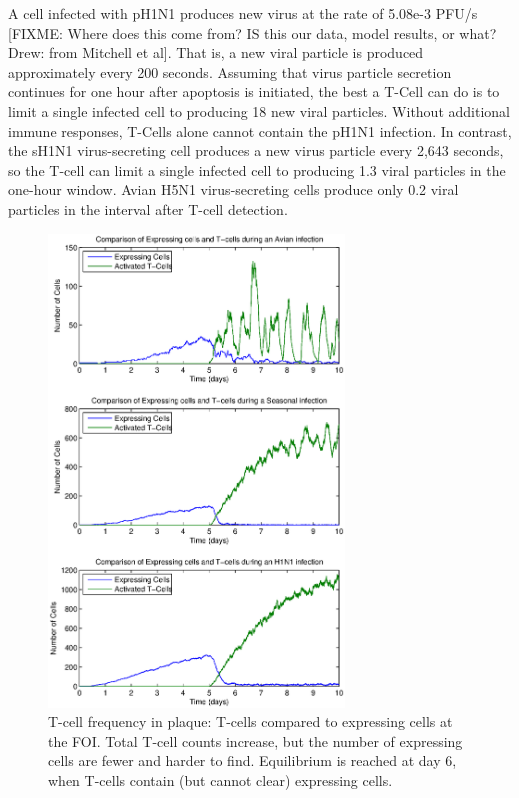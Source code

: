 \documentclass[10pt]{article}
\begin{document}
A cell infected with pH1N1 produces new virus at the rate of 5.08e-3 PFU/s [FIXME: Where does this come from? IS this our data, model results, or what? Drew: from Mitchell et al].  That is, a new viral particle is produced approximately every 200 seconds.  Assuming that virus particle secretion continues for one hour after apoptosis is initiated, the best a T-Cell can do is to limit a single infected cell to producing 18 new viral particles.  Without additional immune responses, T-Cells alone cannot contain the pH1N1 infection.  In contrast, the sH1N1 virus-secreting cell produces a new virus particle every 2,643 seconds, so the T-cell can limit a single infected cell to producing 1.3 viral particles in the one-hour window.  Avian H5N1 virus-secreting cells produce only 0.2 viral particles in the interval after T-cell detection. 


\begin{figure}[ht!]
\begin{center}
 \includegraphics[width=0.7\textwidth]{searcharea}
 \end{center}
\caption{T-cell frequency in plaque: T-cells compared to expressing cells at the FOI.  Total  T-cell counts increase, but the number of expressing cells are fewer and harder to find.  Equilibrium is reached at day 6, when T-cells contain (but cannot clear) expressing cells. } 
 \label{fig:searcharea}
\end{figure}
\end{document}
